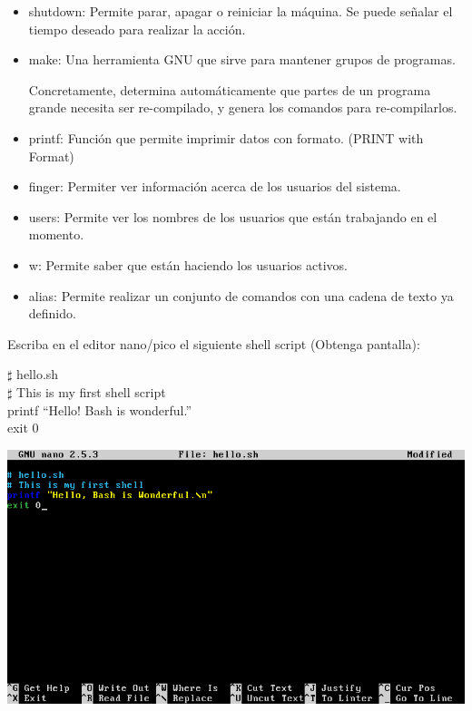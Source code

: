 \begin{itemize}
				\item shutdown: \newline
				Permite parar, apagar o reiniciar la máquina.
				Se puede señalar el tiempo deseado para realizar la acción.
				
				\item make:	\newline
				Una herramienta GNU que sirve para mantener grupos de programas.
				
				Concretamente, determina automáticamente que partes de un programa grande necesita ser re-compilado, y genera los comandos para re-compilarlos.
				
				\item printf: \newline
				Función que permite imprimir datos con formato. (PRINT with Format)
				
				\item finger: \newline
				Permiter ver información acerca de los usuarios del sistema.
				
				\item users: \newline
				Permite ver los nombres de los usuarios que están trabajando en el momento.
				
				\item w: \newline
				Permite saber que están haciendo los usuarios activos.
				
				\item alias: \newline
				Permite realizar un conjunto de comandos con una cadena de texto ya definido.

			\end{itemize}

	Escriba en el editor nano/pico el siguiente shell script (Obtenga pantalla):
	
	\begin{flushleft}
		$\sharp$ hello.sh \\
		$\sharp$ This is my first shell script \\
		printf “Hello! Bash is wonderful.” \\
		exit 0
	\end{flushleft}
	\noindent
	\includegraphics[width=\textwidth]{imagenes/sh.png}

